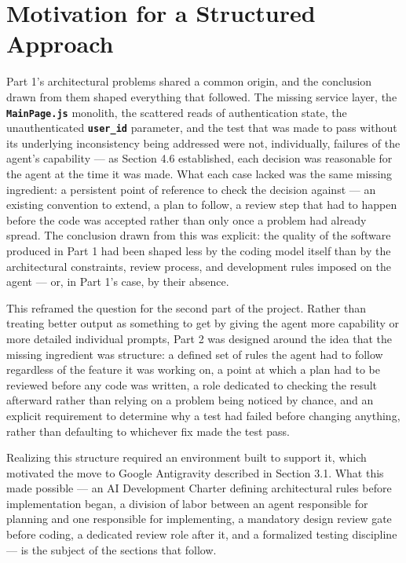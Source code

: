 \section{Motivation for a Structured Approach}

Part 1's architectural problems shared a common origin, and the conclusion drawn from them shaped everything that followed. The missing service layer, the \textbf{\texttt{MainPage.js}} monolith, the scattered reads of authentication state, the unauthenticated \textbf{\texttt{user\_id}} parameter, and the test that was made to pass without its underlying inconsistency being addressed were not, individually, failures of the agent's capability --- as Section 4.6 established, each decision was reasonable for the agent at the time it was made. What each case lacked was the same missing ingredient: a persistent point of reference to check the decision against --- an existing convention to extend, a plan to follow, a review step that had to happen before the code was accepted rather than only once a problem had already spread. The conclusion drawn from this was explicit: the quality of the software produced in Part 1 had been shaped less by the coding model itself than by the architectural constraints, review process, and development rules imposed on the agent --- or, in Part 1's case, by their absence.

This reframed the question for the second part of the project. Rather than treating better output as something to get by giving the agent more capability or more detailed individual prompts, Part 2 was designed around the idea that the missing ingredient was structure: a defined set of rules the agent had to follow regardless of the feature it was working on, a point at which a plan had to be reviewed before any code was written, a role dedicated to checking the result afterward rather than relying on a problem being noticed by chance, and an explicit requirement to determine why a test had failed before changing anything, rather than defaulting to whichever fix made the test pass.

Realizing this structure required an environment built to support it, which motivated the move to Google Antigravity described in Section 3.1. What this made possible --- an AI Development Charter defining architectural rules before implementation began, a division of labor between an agent responsible for planning and one responsible for implementing, a mandatory design review gate before coding, a dedicated review role after it, and a formalized testing discipline --- is the subject of the sections that follow.

